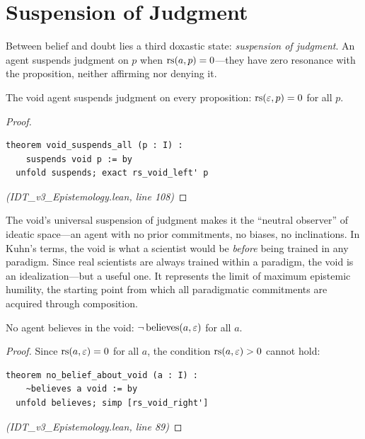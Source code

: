 \section{Suspension of Judgment}

Between belief and doubt lies a third doxastic state: \emph{suspension of judgment}.
An agent suspends judgment on $p$ when $\mathrm{rs}(a, p) = 0$---they have zero resonance
with the proposition, neither affirming nor denying it.

\begin{theorem}
\label{thm:void-suspends}
The void agent suspends judgment on every proposition: $\mathrm{rs}(\varepsilon, p) = 0$ for all $p$.
\end{theorem}

\begin{proof}
\begin{lstlisting}
theorem void_suspends_all (p : I) :
    suspends void p := by
  unfold suspends; exact rs_void_left' p
\end{lstlisting}
\textit{(IDT\_v3\_Epistemology.lean, line 108)}
\end{proof}

\begin{interpretation}
The void's universal suspension of judgment makes it the ``neutral observer''
of ideatic space---an agent with no prior commitments, no biases, no inclinations.
In Kuhn's terms, the void is what a scientist would be \emph{before} being
trained in any paradigm. Since real scientists are always trained within a
paradigm, the void is an idealization---but a useful one. It represents the
limit of maximum epistemic humility, the starting point from which all
paradigmatic commitments are acquired through composition.
\end{interpretation}

\begin{theorem}
\label{thm:no-belief-void}
No agent believes in the void: $\neg\,\mathrm{believes}(a, \varepsilon)$ for all $a$.
\end{theorem}

\begin{proof}
Since $\mathrm{rs}(a, \varepsilon) = 0$ for all $a$, the condition $\mathrm{rs}(a, \varepsilon) > 0$ cannot hold:
\begin{lstlisting}
theorem no_belief_about_void (a : I) :
    ~believes a void := by
  unfold believes; simp [rs_void_right']
\end{lstlisting}
\textit{(IDT\_v3\_Epistemology.lean, line 89)}
\end{proof}

